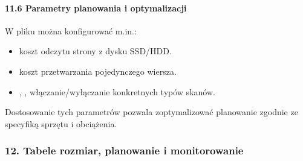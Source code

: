 \documentclass[letterpaper,10pt,polish]{sphinxmanual}
\begin{document}
\sphinxAtStartPar
{}

\begin{sphinxVerbatim}[commandchars=\\\{\}]
        
    
\end{sphinxVerbatim}


\paragraph{11.6 Parametry planowania i optymalizacji}
\label{\detokenize{rozdzial2/Konfiguracja_baz_danych/Konfiguracja_baz_danych:parametry-planowania-i-optymalizacji}}
\sphinxAtStartPar
W pliku  można konfigurować m.in.:
\begin{itemize}
\item {} 
\sphinxAtStartPar
{} \textendash{} koszt odczytu strony z dysku SSD/HDD.

\item {} 
\sphinxAtStartPar
{} \textendash{} koszt przetwarzania pojedynczego wiersza.

\item {} 
\sphinxAtStartPar
{}, ,  \textendash{} włączanie/wyłączanie konkretnych typów skanów.

\end{itemize}

\sphinxAtStartPar
Dostosowanie tych parametrów pozwala zoptymalizować planowanie zgodnie ze specyfiką sprzętu i obciążenia.


\subsubsection{12. Tabele \textendash{} rozmiar, planowanie i monitorowanie}
\label{\detokenize{rozdzial2/Konfiguracja_baz_danych/Konfiguracja_baz_danych:tabele-rozmiar-planowanie-i-monitorowanie}}
\end{document}
